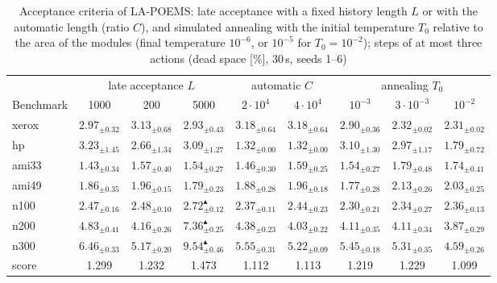 \begin{table}
\centering
\footnotesize
\setlength{\tabcolsep}{4pt}
\begin{tabular}{@{}lcccccccc@{}}
\toprule
 & \multicolumn{3}{c}{late acceptance $L$} & \multicolumn{2}{c}{automatic $C$} & \multicolumn{3}{c}{annealing $T_0$} \\
Benchmark & 1000 & 200 & 5000 & $2{\cdot}10^4$ & $4{\cdot}10^4$ & $10^{-3}$ & $3{\cdot}10^{-3}$ & $10^{-2}$ \\
\midrule
xerox & $2.97_{\pm 0.32}$ & $3.13_{\pm 0.68}$ & $2.93_{\pm 0.43}$ & $3.18_{\pm 0.64}$ & $3.18_{\pm 0.64}$ & $2.90_{\pm 0.36}$ & $\mathbf{2.32_{\pm 0.02}}$ & $\mathbf{2.31_{\pm 0.02}}$ \\
hp & $3.23_{\pm 1.45}$ & $2.66_{\pm 1.34}$ & $3.09_{\pm 1.27}$ & $\mathbf{1.32_{\pm 0.00}}$ & $\mathbf{1.32_{\pm 0.00}}$ & $3.10_{\pm 1.30}$ & $2.97_{\pm 1.17}$ & $1.79_{\pm 0.72}$ \\
ami33 & $1.43_{\pm 0.34}$ & $1.57_{\pm 0.40}$ & $1.54_{\pm 0.27}$ & $1.46_{\pm 0.30}$ & $1.59_{\pm 0.25}$ & $1.54_{\pm 0.27}$ & $1.79_{\pm 0.48}$ & $1.74_{\pm 0.41}$ \\
ami49 & $1.86_{\pm 0.35}$ & $1.96_{\pm 0.15}$ & $1.79_{\pm 0.23}$ & $1.88_{\pm 0.28}$ & $1.96_{\pm 0.18}$ & $1.77_{\pm 0.28}$ & $2.13_{\pm 0.26}$ & $2.03_{\pm 0.25}$ \\
n100 & $2.47_{\pm 0.16}$ & $2.48_{\pm 0.10}$ & $2.72_{\pm 0.12}^{\blacktriangle}$ & $2.37_{\pm 0.11}$ & $2.44_{\pm 0.23}$ & $2.30_{\pm 0.21}$ & $2.34_{\pm 0.27}$ & $2.36_{\pm 0.13}$ \\
n200 & $4.83_{\pm 0.41}$ & $\mathbf{4.16_{\pm 0.26}}$ & $7.36_{\pm 0.25}^{\blacktriangle}$ & $4.38_{\pm 0.23}$ & $\mathbf{4.03_{\pm 0.22}}$ & $\mathbf{4.11_{\pm 0.35}}$ & $\mathbf{4.11_{\pm 0.34}}$ & $\mathbf{3.87_{\pm 0.29}}$ \\
n300 & $6.46_{\pm 0.33}$ & $\mathbf{5.17_{\pm 0.20}}$ & $9.54_{\pm 0.46}^{\blacktriangle}$ & $\mathbf{5.55_{\pm 0.31}}$ & $\mathbf{5.22_{\pm 0.09}}$ & $\mathbf{5.45_{\pm 0.18}}$ & $\mathbf{5.31_{\pm 0.35}}$ & $\mathbf{4.59_{\pm 0.26}}$ \\
\midrule
score & 1.299 & 1.232 & 1.473 & 1.112 & 1.113 & 1.219 & 1.229 & 1.099 \\
\bottomrule
\end{tabular}
\caption{Acceptance criteria of LA-POEMS: late acceptance with a fixed history length $L$ or with the automatic length (ratio $C$), and simulated annealing with the initial temperature $T_0$ relative to the area of the modules (final temperature $10^{-6}$, or $10^{-5}$ for $T_0 = 10^{-2}$); steps of at most three actions (dead space [\%], 30\,s, seeds 1--6)}
\label{tab:rq3acceptance}
\end{table}
